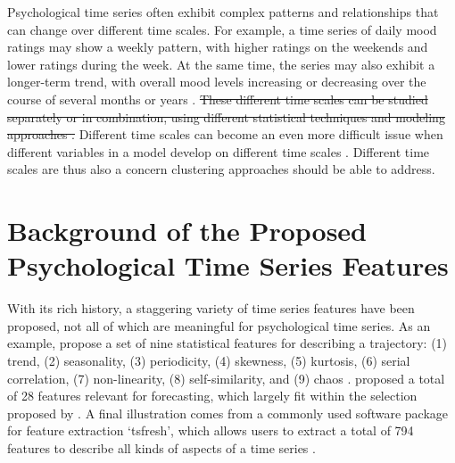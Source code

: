 \documentclass[man, 12pt, a4paper, mask, floatsintext]{apa7}
\theoremstyle{break}
\theoremstyle{plain}
\begin{document}
Psychological time series often exhibit complex patterns and relationships that can change over different time scales. For example, a time series of daily mood ratings may show a weekly pattern, with higher ratings on the weekends and lower ratings during the week. At the same time, the series may also exhibit a longer-term trend, with overall mood levels increasing or decreasing over the course of several months or years \citep[e.g.,][]{Ram2014}. \sout{These different time scales can be studied separately or in combination, using different statistical techniques and modeling approaches \citep[][]{bertenthal2007, jeronimus2019a}.} Different time scales can become an even more difficult issue when different variables in a model develop on different time scales \citep{bringmann2022b}. Different time scales are thus also a concern clustering approaches should be able to address.



\section{Background of the Proposed Psychological Time Series Features}
\label{app:FeatureBackground}

With its rich history, a staggering variety of time series features have been proposed, not all of which are meaningful for psychological time series. As an example, \citet{wang2006} propose a set of nine statistical features for describing a trajectory: (1) trend, (2) seasonality, (3) periodicity, (4) skewness, (5) kurtosis, (6) serial correlation, (7) non-linearity, (8) self-similarity, and (9) chaos \citep[also see][]{fulcher2013}. \citet{adya2001} proposed a total of 28 features relevant for forecasting, which largely fit within the selection proposed by \citet{wang2006}. A final illustration comes from a commonly used software package for feature extraction `tsfresh', which allows users to extract a total of 794 features to describe all kinds of aspects of a time series \citep[][]{christ2018}. 
\end{document}
